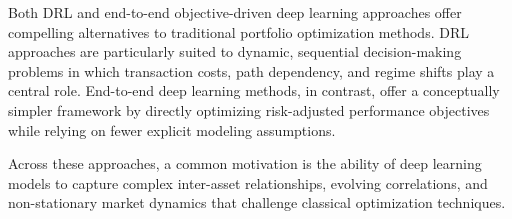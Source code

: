 Both DRL and end-to-end objective-driven deep learning approaches offer compelling alternatives to traditional portfolio optimization methods. DRL approaches are particularly suited to dynamic, sequential decision-making problems in which transaction costs, path dependency, and regime shifts play a central role. End-to-end deep learning methods, in contrast, offer a conceptually simpler framework by directly optimizing risk-adjusted performance objectives while relying on fewer explicit modeling assumptions.

Across these approaches, a common motivation is the ability of deep learning models to capture complex inter-asset relationships, evolving correlations, and non-stationary market dynamics that challenge classical optimization techniques.

